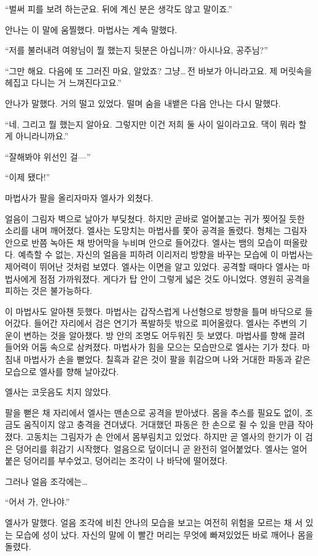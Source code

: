 ``벌써 피를 보려 하는군요. 뒤에 계신 분은 생각도 않고 말이죠.''

안나는 이 말에 움찔했다. 마법사는 계속 말했다.

``저를 불러내려 여왕님이 뭘 했는지 뒷분은 아십니까? 아시나요, 공주님?''

``그만 해요. 다음에 또 그러진 마요, 알았죠? 그냥\ldots\,전 바보가 아니라고요. 제 머릿속을 헤집고 다니는 거 느껴진다고요.''

안나가 말했다. 거의 떨고 있었다. 떨며 숨을 내뱉은 다음 안나는 다시 말했다.

``네, 그리고 뭘 했는지 알아요. 그렇지만 이건 저희 둘 사이 일이라고요. 댁이 뭐라 할 게 아니라니까요.''

``잘해봐야 위선인 걸—''

``이제 됐다!''

마법사가 팔을 올리자마자 엘사가 외쳤다.

얼음이 그림자 벽으로 날아가 부딪쳤다. 하지만 곧바로 얼어붙고는 귀가 찢어질 듯한 소리를 내며 깨어졌다. 엘사는 도망치는 마법사를 쫓아 공격을 돌렸다. 형체는 그림자 안으로 반쯤 녹아든 채 방어막을 누비며 안으로 들어갔다. 엘사는 뱀의 모습이 떠올랐다. 예측할 수 없는, 자신의 얼음을 피하려 이리저리 방향을 바꾸는 모습에 이 마법사는 제어력이 뛰어난 것처럼 보였다. 엘사는 이면을 알고 있었다. 공격할 때마다 엘사는 마법사에게 점점 가까워졌다. 게다가 탑 안이 그렇게 넓은 것도 아니었다. 영원히 공격을 피하는 것은 불가능하다.

이 마법사도 알아챈 듯했다. 마법사는 갑작스럽게 나선형으로 방향을 틀며 바닥으로 들어갔다. 들어간 자리에서 검은 연기가 폭발하듯 밖으로 피어올랐다. 엘사는 주변의 기운이 변하는 것을 알아챘다. 방 안의 조명도 어두워진 듯 보였다. 마법사를 향해 끌려 들어와 어둠 속으로 삼켜졌다. 마법사가 힘을 모으는 모습만으로 엘사는 기가 찼다. 마침내 마법사가 손을 뻗었다. 칠흑과 같은 것이 팔을 휘감으며 나와 거대한 파동과 같은 모습으로 엘사를 향해 날아갔다.

엘사는 코웃음도 치지 않았다.

팔을 뻗은 채 자리에서 엘사는 맨손으로 공격을 받아냈다. 몸을 추스를 필요도 없이, 조금도 움직이지 않고 충격을 견뎌냈다. 거대했던 파동은 한 손으로 쥘 수 있을 만큼 작아졌다. 고동치는 그림자가 손 안에서 몸부림치고 있었다. 하지만 곧 엘사의 한기가 이 검은 덩어리를 휘감기 시작했다. 얼음으로 덮이더니 곧 완전히 얼어붙었다. 엘사는 얼어붙은 덩어리를 부수었고, 덩어리는 조각이 나 바닥에 떨어졌다.

그러나 얼음 조각에는\ldots

``어서 가, 안나야.''

엘사가 말했다. 얼음 조각에 비친 안나의 모습을 보고는 여전히 위험을 모르는 채 서 있는 모습에 성이 났다. 자신의 말에 이 빨간 머리는 무엇에 빠져있었든 바로 깨어나 몸을 돌렸다.

